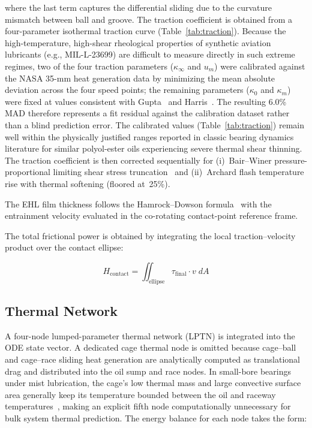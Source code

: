 \documentclass[applsci,article,submit,pdftex,moreauthors]{Definitions/mdpi}
\begin{document}
where the last term captures the differential sliding due to the curvature mismatch between ball and groove. The traction coefficient is obtained from a four-parameter isothermal traction curve (Table~\ref{tab:traction}). Because the high-temperature, high-shear rheological properties of synthetic aviation lubricants (e.g., MIL-L-23699) are difficult to measure directly in such extreme regimes, two of the four traction parameters ($\kappa_\infty$ and $u_m$) were calibrated against the NASA 35-mm heat generation data by minimizing the mean absolute deviation across the four speed points; the remaining parameters ($\kappa_0$ and $\kappa_m$) were fixed at values consistent with Gupta~\cite{Gupta1984} and Harris~\cite{Harris2006}. The resulting 6.0\% MAD therefore represents a fit residual against the calibration dataset rather than a blind prediction error. The calibrated values (Table~\ref{tab:traction}) remain well within the physically justified ranges reported in classic bearing dynamics literature for similar polyol-ester oils experiencing severe thermal shear thinning. The traction coefficient is then corrected sequentially for (i)~Bair--Winer pressure-proportional limiting shear stress truncation~\cite{Bair1979} and (ii)~Archard flash temperature rise with thermal softening (floored at~25\%).

The EHL film thickness follows the Hamrock--Dowson formula~\cite{Hamrock1977} with the entrainment velocity evaluated in the co-rotating contact-point reference frame.

The total frictional power is obtained by integrating the local traction--velocity product over the contact ellipse:

\begin{linenomath}
\begin{equation}
    H_{\text{contact}} = \iint_{\text{ellipse}} \tau_{\text{final}} \cdot v \; dA
    \label{eq:heat_contact}
\end{equation}
\end{linenomath}


\subsection{Thermal Network}
\label{sec:thermal}

A four-node lumped-parameter thermal network (LPTN) is integrated into the ODE state vector. A dedicated cage thermal node is omitted because cage--ball and cage--race sliding heat generation are analytically computed as translational drag and distributed into the oil sump and race nodes. In small-bore bearings under mist lubrication, the cage's low thermal mass and large convective surface area generally keep its temperature bounded between the oil and raceway temperatures~\cite{Zheng2018}, making an explicit fifth node computationally unnecessary for bulk system thermal prediction. The energy balance for each node takes the form:
\end{document}
